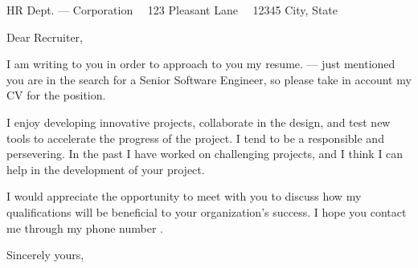 \documentclass{scrlttr2}
\renewcommand{\\}{\ {\large\textperiodcentered}\ }
\begin{document}

\begin{letter}{ %
HR Dept. --- Corporation\\
123 Pleasant Lane\\
12345 City, State
}


\opening{Dear Recruiter,}

I am writing to you in order to approach to you my resume. --- just mentioned you are in the search for a Senior Software Engineer, so please take in account my CV for the position.\\

I enjoy developing innovative projects, collaborate in the design, and test new tools to accelerate the progress of the project. I tend to be a responsible and persevering. In the past I have worked on challenging projects, and I think I can help in the development of your project.\\

I would appreciate the opportunity to meet with you to discuss how my qualifications will be beneficial to your organization’s success. I hope you contact me through my phone number .\\

Sincerely yours, \\ \\ \\


\end{letter}
\end{document}

